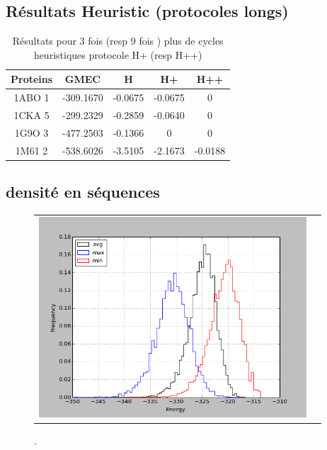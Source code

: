 \documentclass[a4paper,12pt]{book}
\begin{document}
    \clearpage

   \subsection{ Résultats Heuristic (protocoles longs)}


    \begin{table}[h]
      \centering

      \begin{tabular}{|c|c|c|c|c|}

        \hline
        Proteins & GMEC & H & H+ & H++ \\
        \hline
        1ABO 1 & -309.1670 & -0.0675 & -0.0675 & 0 \\
        1CKA 5 & -299.2329 & -0.2859 & -0.0640 & 0 \\
        1G9O 3 & -477.2503 & -0.1366 & 0 & 0 \\
        1M61 2 & -538.6026 & -3.5105 & -2.1673 & -0.0188 \\
        \hline


 \end{tabular}      
 \caption{Résultats pour 3 fois (resp 9 fois ) plus de cycles heuristiques protocole H+ (resp H++)}
 \label{tab_echec2BYG__1}       
\end{table}



    \clearpage

    \clearpage

   \subsection{densité en séquences }



    \begin{figure}[h]
      \centering
      \begin{tabular}{cc} 
        \includegraphics[width=10cm]{resultats/comparaisons/graphe/histo1_aa_Tambiante.png} &
      \end{tabular}
      
      \caption{.}
      \label{temps_CPU}
    \end{figure}
\end{document}
